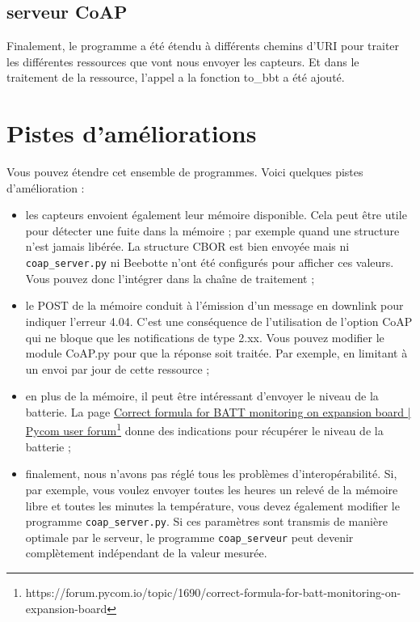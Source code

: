 \subsection{serveur CoAP}

Finalement, le programme  a été étendu à différents chemins d'URI pour traiter les différentes ressources que vont nous envoyer les capteurs. Et dans le traitement de la ressource, l'appel a la fonction to_bbt a été ajouté.

\section {Pistes d'améliorations}

Vous pouvez étendre cet ensemble de programmes. Voici quelques pistes d'amélioration :

\begin{itemize}

\item les capteurs envoient également leur mémoire disponible. Cela peut être utile pour détecter une fuite dans la mémoire ; par exemple quand une structure n'est jamais libérée. La structure CBOR est bien envoyée mais ni \texttt{coap\_server.py} ni Beebotte n'ont été configurés pour afficher ces valeurs. Vous pouvez donc l'intégrer dans la chaîne de traitement ;
\item le POST de la mémoire conduit à l'émission d'un message en downlink pour indiquer l'erreur 4.04. C'est une conséquence de l'utilisation de l'option CoAP  qui ne bloque que les notifications de type 2.xx. Vous pouvez modifier le module CoAP.py pour que la réponse soit traitée. Par exemple, en limitant à un envoi par jour de cette ressource ;
\item en plus de la mémoire, il peut être intéressant d'envoyer le niveau de la batterie. La page \href{https://forum.pycom.io/topic/1690/correct-formula-for-batt-monitoring-on-expansion-board}{Correct formula for BATT monitoring on expansion board | Pycom user forum}\footnote{https://forum.pycom.io/topic/1690/correct-formula-for-batt-monitoring-on-expansion-board} donne des indications pour récupérer le niveau de la batterie ;
\item finalement, nous n'avons pas réglé tous les problèmes d'interopérabilité. Si, par exemple, vous voulez envoyer toutes les heures un relevé de la mémoire libre et toutes les minutes la température, vous devez également modifier le programme \texttt{coap\_server.py}. Si ces paramètres sont transmis de manière optimale par le serveur, le programme \texttt{coap\_serveur} peut devenir complètement indépendant de la valeur mesurée.
\end{itemize}